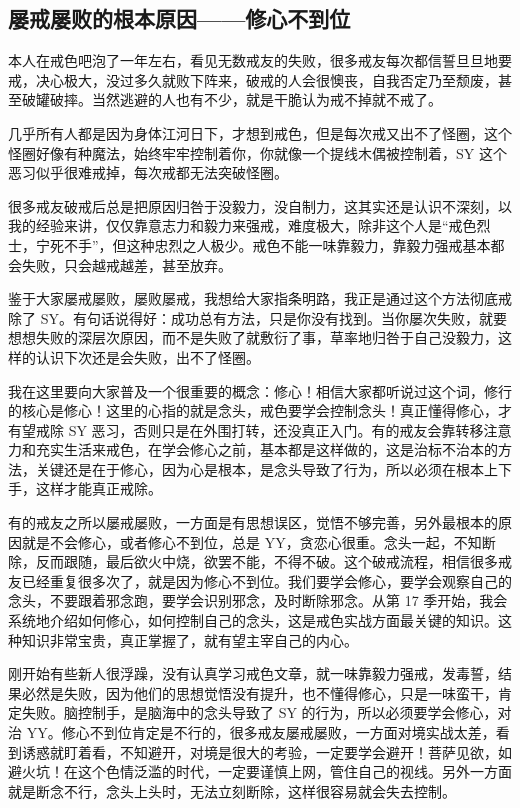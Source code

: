 \documentclass[fontset=founder]{ctexart}
\begin{document}
\subsection{屡戒屡败的根本原因——修心不到位}

本人在戒色吧泡了一年左右，看见无数戒友的失败，很多戒友每次都信誓旦旦地要戒，决心极大，没过多久就败下阵来，破戒的人会很懊丧，自我否定乃至颓废，甚至破罐破摔。当然逃避的人也有不少，就是干脆认为戒不掉就不戒了。

几乎所有人都是因为身体江河日下，才想到戒色，但是每次戒又出不了怪圈，这个怪圈好像有种魔法，始终牢牢控制着你，你就像一个提线木偶被控制着，SY 这个恶习似乎很难戒掉，每次戒都无法突破怪圈。

很多戒友破戒后总是把原因归咎于没毅力，没自制力，这其实还是认识不深刻，以我的经验来讲，仅仅靠意志力和毅力来强戒，难度极大，除非这个人是“戒色烈士，宁死不手”，但这种忠烈之人极少。戒色不能一味靠毅力，靠毅力强戒基本都会失败，只会越戒越差，甚至放弃。

鉴于大家屡戒屡败，屡败屡戒，我想给大家指条明路，我正是通过这个方法彻底戒除了 SY。有句话说得好：成功总有方法，只是你没有找到。当你屡次失败，就要想想失败的深层次原因，而不是失败了就敷衍了事，草率地归咎于自己没毅力，这样的认识下次还是会失败，出不了怪圈。

我在这里要向大家普及一个很重要的概念：修心！相信大家都听说过这个词，修行的核心是修心！这里的心指的就是念头，戒色要学会控制念头！真正懂得修心，才有望戒除 SY 恶习，否则只是在外围打转，还没真正入门。有的戒友会靠转移注意力和充实生活来戒色，在学会修心之前，基本都是这样做的，这是治标不治本的方法，关键还是在于修心，因为心是根本，是念头导致了行为，所以必须在根本上下手，这样才能真正戒除。

有的戒友之所以屡戒屡败，一方面是有思想误区，觉悟不够完善，另外最根本的原因就是不会修心，或者修心不到位，总是 YY，贪恋心很重。念头一起，不知断除，反而跟随，最后欲火中烧，欲罢不能，不得不破。这个破戒流程，相信很多戒友已经重复很多次了，就是因为修心不到位。我们要学会修心，要学会观察自己的念头，不要跟着邪念跑，要学会识别邪念，及时断除邪念。从第 17 季开始，我会系统地介绍如何修心，如何控制自己的念头，这是戒色实战方面最关键的知识。这种知识非常宝贵，真正掌握了，就有望主宰自己的内心。

刚开始有些新人很浮躁，没有认真学习戒色文章，就一味靠毅力强戒，发毒誓，结果必然是失败，因为他们的思想觉悟没有提升，也不懂得修心，只是一味蛮干，肯定失败。脑控制手，是脑海中的念头导致了 SY 的行为，所以必须要学会修心，对治 YY。修心不到位肯定是不行的，很多戒友屡戒屡败，一方面对境实战太差，看到诱惑就盯着看，不知避开，对境是很大的考验，一定要学会避开！菩萨见欲，如避火坑！在这个色情泛滥的时代，一定要谨慎上网，管住自己的视线。另外一方面就是断念不行，念头上头时，无法立刻断除，这样很容易就会失去控制。
\end{document}
